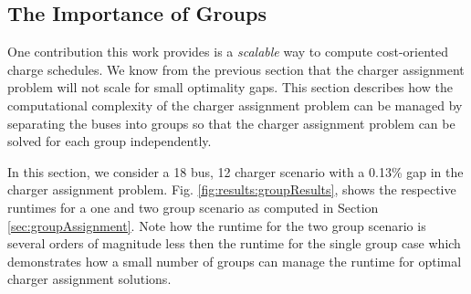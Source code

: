 \subsection{The Importance of Groups}
One contribution this work provides is a {\it scalable} way to compute cost-oriented charge schedules. We know from the previous section that the charger assignment problem will not scale for small optimality gaps. This section describes how the computational complexity of the charger assignment problem can be managed by separating the buses into groups so that the charger assignment problem can be solved for each group independently. 
\par In this section, we consider a 18 bus, 12 charger scenario with a 0.13\% gap in the charger assignment problem. Fig. \ref{fig:results:groupResults}, shows the respective runtimes for a one and two group scenario as computed in Section \ref{sec:groupAssignment}. Note how the runtime for the two group scenario is several orders of magnitude less then the runtime for the single group case which demonstrates how a small number of groups can manage the runtime for optimal charger assignment solutions.
 
